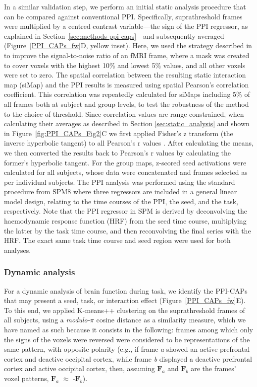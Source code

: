 In a similar validation step, we perform an initial static analysis procedure that can be compared against conventional PPI. Specifically, suprathreshold frames were multiplied by a centred contrast variable---the sign of the PPI regressor, as explained in Section~\ref{sec:methods-ppi-caps}---and subsequently averaged (Figure~\ref{PPI_CAPs_fw}D, yellow inset). Here, we used the strategy described in \citet{Liu2013} to improve the signal-to-noise ratio of an fMRI frame, where a mask was created to cover voxels with the highest 10\% and lowest 5\% values, and all other voxels were set to zero. The spatial correlation between the resulting static interaction map (siMap) and the PPI results is measured using spatial Pearson’s correlation coefficient. This correlation was repeatedly calculated for siMaps including 5\% of all frames both at subject and group levels, to test the robustness of the method to the choice of threshold. Since correlation values are range-constrained, when calculating their averages as described in Section \ref{sec:static_analysis} and shown in Figure~\ref{fig:PPI_CAPs_Fig2}C we first applied Fisher's z transform (the inverse hyperbolic tangent) to all Pearson's r values \citep{Cox2008}. After calculating the means, we then converted the results back to Pearson's r values by calculating the former's hyperbolic tangent. For the group maps, z-scored seed activations were calculated for all subjects, whose data were concatenated and frames selected as per individual subjects.    The PPI analysis was performed using the standard procedure from  SPM8 where three regressors are included in a general linear model design, relating to the time courses of the PPI, the seed, and the task, respectively. Note that the PPI regressor in SPM is derived by deconvolving the haemodynamic response function (HRF) from the seed time course, multiplying the latter by the task time course, and then reconvolving the final series with the HRF. The exact same task time course and seed region were used for both analyses.

\subsubsection{Dynamic analysis} \label{sectionKmeans}
For a dynamic analysis of brain function during task, we identify the PPI-CAPs that may present a seed, task, or interaction effect (Figure~\ref{PPI_CAPs_fw}E). To this end, we applied  K-means++ clustering on the suprathreshold frames of all subjects, using a \textit{modulo-$\pi$} cosine distance as a similarity measure, which we have named as such because it consists in the following: frames among which only the signs of the voxels were reversed were considered to be representations of the same pattern, with opposite polarity (e.g., if frame \textit{a} showed an active prefrontal cortex and deactive occipital cortex, while frame \textit{b} displayed a deactive prefrontal cortex and active occipital cortex, then, assuming {$\mathbf{F}_a$} and {$\mathbf{F}_b$} are the frames' voxel patterns, {$\mathbf{F}_a$} $\approx$ -{$\mathbf{F}_b$}). 

